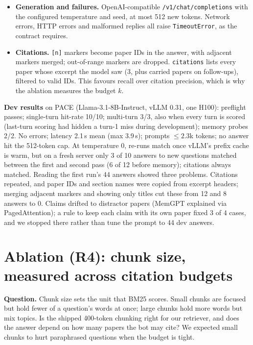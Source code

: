 \documentclass[10pt,letterpaper]{article}
\newcommand{\code}[1]{\texttt{#1}}
\begin{document}
\begin{itemize}
  \item \textbf{Generation and failures.} OpenAI-compatible \code{/v1/chat/completions} with the
    configured temperature and seed, at most 512 new tokens. Network errors, HTTP errors and
    malformed replies all raise \code{TimeoutError}, as the contract requires.
  \item \textbf{Citations.} \code{[n]} markers become paper IDs in the answer, with adjacent markers
    merged; out-of-range markers are dropped. \code{citations} lists every paper whose excerpt the model saw (3, plus
    carried papers on follow-ups), filtered to valid IDs. This favours recall over citation
    precision, which is why the ablation measures the budget $k$.
\end{itemize}

\textbf{Dev results} on PACE (Llama-3.1-8B-Instruct, vLLM 0.31, one H100): preflight passes;
single-turn hit-rate 10/10; multi-turn 3/3, also when every turn is scored (last-turn scoring had
hidden a turn-1 miss during development); memory probes 2/2. No errors; latency 2.1\,s mean (max
3.9\,s); prompts ${\le}2.3$k tokens; no answer hit the 512-token cap. At temperature 0, re-runs
match once vLLM's prefix cache is warm, but on a fresh server only 3 of 10 answers to new questions
matched between the first and second pass (6 of 12 before memory); citations always matched. Reading the first
run's 44 answers showed three problems. Citations repeated, and paper IDs and section names were
copied from excerpt headers; merging adjacent markers and showing only titles cut these from 12
and 8 answers to 0. Claims drifted to distractor papers (MemGPT explained via PagedAttention); a
rule to keep each claim with its own paper fixed 3 of 4 cases, and we stopped there rather than
tune the prompt to 44 dev answers.

\section{Ablation (R4): chunk size, measured across citation budgets}

\textbf{Question.} Chunk size sets the unit that BM25 scores. Small chunks are focused but hold
fewer of a question's words at once; large chunks hold more words but mix topics. Is the shipped
400-token chunking right for our retriever, and does the answer depend on how many papers the bot
may cite? We expected small chunks to hurt paraphrased questions when the budget is tight.
\end{document}
